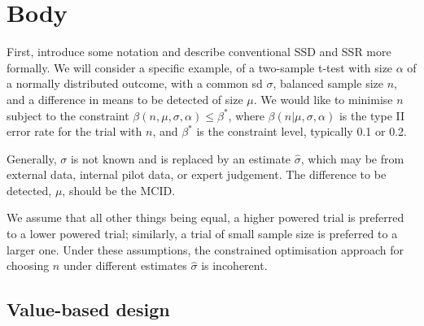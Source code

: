 \documentclass[sagev]{sagej}
\begin{document}
\section{Body}

First, introduce some notation and describe conventional SSD and SSR more formally. We will consider a specific example, of a two-sample t-test with size $\alpha$ of a normally distributed outcome, with a common sd $\sigma$, balanced sample size $n$, and a difference in means to be detected of size $\mu$. We would like to minimise $n$ subject to the constraint $\beta(n, \mu, \sigma, \alpha) \leq \beta^*$, where $\beta(n | \mu, \sigma, \alpha)$ is the type II error rate for the trial with $n$, and $\beta^*$ is the constraint level, typically 0.1 or 0.2.

Generally, $\sigma$ is not known and is replaced by an estimate $\hat{\sigma}$, which may be from external data, internal pilot data, or expert judgement. The difference to be detected, $\mu$, should be the MCID.

We assume that all other things being equal, a higher powered trial is preferred to a lower powered trial; similarly, a trial of small sample size is preferred to a larger one. Under these assumptions, the constrained optimisation approach for choosing $n$ under different estimates $\hat{\sigma}$ is incoherent.

\subsection{Value-based design}
\end{document}
